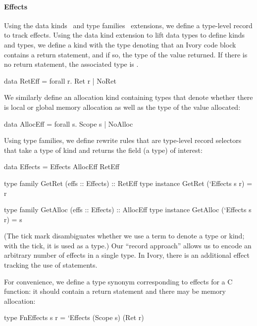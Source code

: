 \paragraph{Effects}
Using the data kinds~\cite{} and type families~\cite{} extensions, we define a
type-level record to track effects.  Using the data kind extension to lift data
types to define kinds and types, we define a kind  with the type
 denoting that an Ivory code block contains a return statement, and if
so, the type of the value returned.  If there is no return statement, the
associated type is .
\begin{code}
data RetEff   = forall r. Ret r | NoRet
\end{code}
\noindent
We similarly define an allocation kind containing types that denote whether
there is local or global memory allocation as well as the type of the value
allocated:
\begin{code}
data AllocEff = forall s. Scope s | NoAlloc
\end{code}
\noindent
Using type families, we define rewrite rules that are type-level record
selectors that take a type of kind  and returns the field (a type)
of interest:
\begin{code}
data Effects  = Effects AllocEff RetEff

type family   GetRet (effs :: Effects) :: RetEff
type instance GetRet (`Effects s r) = r

type family   GetAlloc (effs :: Effects) :: AllocEff
type instance GetAlloc (`Effects s r) = s
\end{code}
\noindent
(The tick mark disambiguates whether we use a term to denote a type or kind;
with the tick, it is used as a type.)  Our ``record approach'' allows us to
encode an arbitrary number of effects in a single type.  In Ivory, there is an
additional effect tracking the use of  statements.

For convenience, we define a type synonym corresponding to effects for a C
function: it should contain a return statement and there may be memory
allocation:
\begin{code}
type FnEffects s r = `Effects (Scope s) (Ret r)
\end{code}

